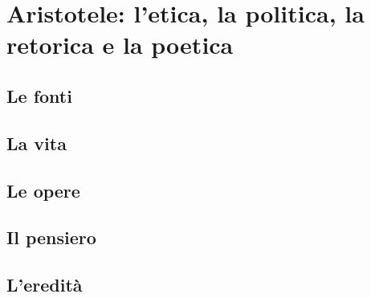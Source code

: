 \chapter{Aristotele: l'etica, la politica, la retorica e la poetica}

\section{Le fonti}

\section{La vita}

\section{Le opere}

\section{Il pensiero}

\section{L'eredità}
